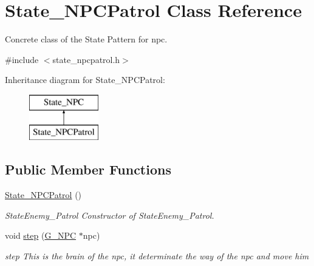 \hypertarget{class_state___n_p_c_patrol}{}\section{State\+\_\+\+N\+P\+C\+Patrol Class Reference}
\label{class_state___n_p_c_patrol}


Concrete class of the State Pattern for npc.  




{\ttfamily \#include $<$state\+\_\+npcpatrol.\+h$>$}

Inheritance diagram for State\+\_\+\+N\+P\+C\+Patrol\+:\begin{figure}[H]
\begin{center}
\leavevmode
\includegraphics[height=2.000000cm]{class_state___n_p_c_patrol}
\end{center}
\end{figure}
\subsection*{Public Member Functions}
\begin{DoxyCompactItemize}
\item 
\hypertarget{class_state___n_p_c_patrol_a51a03345cdf2a44f50dcb515bcbbbf92}{}\hyperlink{class_state___n_p_c_patrol_a51a03345cdf2a44f50dcb515bcbbbf92}{State\+\_\+\+N\+P\+C\+Patrol} ()\label{class_state___n_p_c_patrol_a51a03345cdf2a44f50dcb515bcbbbf92}

\begin{DoxyCompactList}\small\item\em State\+Enemy\+\_\+\+Patrol Constructor of State\+Enemy\+\_\+\+Patrol. \end{DoxyCompactList}\item 
void \hyperlink{class_state___n_p_c_patrol_ad9a4dab7ef0601ceff090595e7cac92c}{step} (\hyperlink{class_g___n_p_c}{G\+\_\+\+N\+P\+C} $\ast$npc)
\begin{DoxyCompactList}\small\item\em step This is the brain of the npc, it determinate the way of the npc and move him \end{DoxyCompactList}\end{DoxyCompactItemize}


